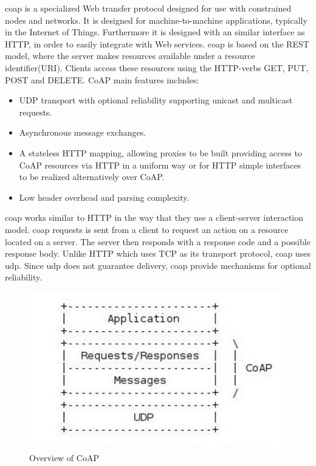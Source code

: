 \gls{coap} is a specialized Web transfer protocol designed for use with
constrained nodes and  networks\cite{rfc-7252}. It is designed for
machine-to-machine applications, typically in the Internet of Things.
Furthermore it is designed with an similar interface as HTTP, in order to easily
integrate with Web services. \gls{coap} is based on the REST model, where the
server makes resources available  under a resource identifier(URI). Clients
access these resources using the HTTP-verbs GET, PUT, POST and DELETE. CoAP main
features includes:

\begin{itemize}

    \item UDP transport with optional reliability supporting unicast and
    multicast requests.

    \item Asynchronous message exchanges.

    \item A stateless HTTP mapping, allowing proxies to be built providing
    access to CoAP resources via HTTP in a uniform way or for HTTP simple
    interfaces to be realized alternatively over CoAP.

     \item Low header overhead and parsing complexity.

\end{itemize}

\gls{coap} works similar to HTTP in the way that they use a client-server
interaction model. \gls{coap} requests is sent from a client to request an
action on a resource located on a server. The server then responds with a
response code and a possible response body. Unlike HTTP which uses TCP as its
transport protocol, \gls{coap} uses \gls{udp}. Since \gls{udp} does not
guarantee delivery, \gls{coap} provide mechanisms for optional reliability.

\begin{figure}[h]
\centering
\includegraphics[scale=0.6]{images/coap.pdf}
\caption{Overview of CoAP}
\end{figure}


